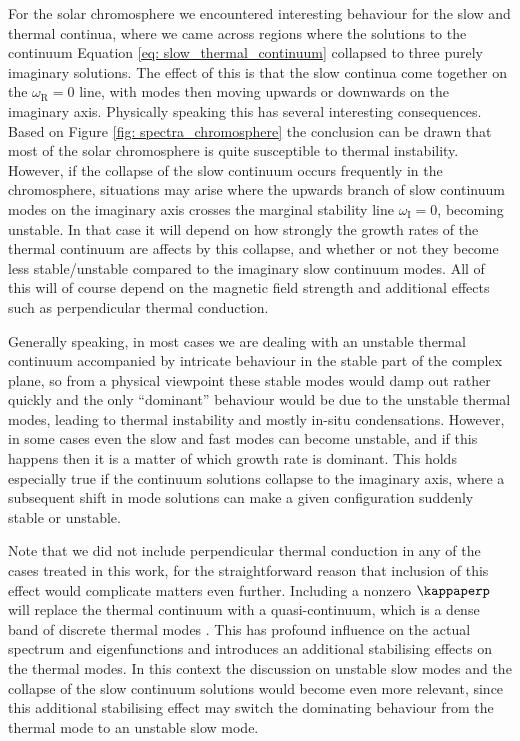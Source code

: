 For the solar chromosphere we encountered interesting behaviour for the slow and thermal continua, where we came across regions where the solutions to the continuum Equation \eqref{eq: slow_thermal_continuum} collapsed to three purely imaginary solutions. The effect of this is that the slow continua come together on the $\omega_\text{R}=0$ line, with modes then moving upwards or downwards on the imaginary axis. Physically speaking this has several interesting consequences. Based on Figure \ref{fig: spectra_chromosphere} the conclusion can be drawn that most of the solar chromosphere is quite susceptible to thermal instability. However, if the collapse of the slow continuum occurs frequently in the chromosphere, situations may arise where the upwards branch of slow continuum modes on the imaginary axis crosses the marginal stability line $\omega_\text{I} = 0$, becoming unstable. In that case it will depend on how strongly the growth rates of the thermal continuum are affects by this collapse, and whether or not they become less stable/unstable compared to the imaginary slow continuum modes. All of this will of course depend on the magnetic field strength and additional effects such as perpendicular thermal conduction.

Generally speaking, in most cases we are dealing with an unstable thermal continuum accompanied by intricate behaviour in the stable part of the complex plane, so from a physical viewpoint these stable modes would damp out rather quickly and the only ``dominant'' behaviour would be due to the unstable thermal modes, leading to thermal instability and mostly in-situ condensations. However, in some cases even the slow and fast modes can become unstable, and if this happens then it is a matter of which growth rate is dominant. This holds especially true if the continuum solutions collapse to the imaginary axis, where a subsequent shift in mode solutions can make a given configuration suddenly stable or unstable.

Note that we did not include perpendicular thermal conduction in any of the cases treated in this work, for the straightforward reason that inclusion of this effect would complicate matters even further. Including a nonzero $\kappaperp$ will replace the thermal continuum with a quasi-continuum, which is a dense band of discrete thermal modes \citep{vanderlinden1991}. This has profound influence on the actual spectrum and eigenfunctions and introduces an additional stabilising effects on the thermal modes. In this context the discussion on unstable slow modes and the collapse of the slow continuum solutions would become even more relevant, since this additional stabilising effect may switch the dominating behaviour from the thermal mode to an unstable slow mode.

